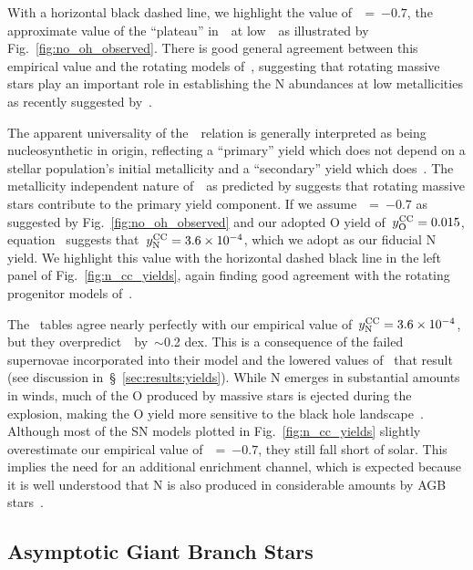 \documentclass[ms.tex]{subfiles}
\begin{document}
With a horizontal black dashed line, we highlight the value
of~\no\subcc~=~$-0.7$, the approximate value of the ``plateau'' in~\no~at
low~\oh~as illustrated by Fig.~\ref{fig:no_oh_observed}.
There is good general agreement between this empirical value and the rotating
models of~\citet{Limongi2018}, suggesting that rotating massive stars play an
important role in establishing the N abundances at low metallicities as
recently suggested by~\citet{Grisoni2021}.
\par
The apparent universality of the~\ohno~relation is generally interpreted as
being nucleosynthetic in origin, reflecting a ``primary'' yield which does not
depend on a stellar population's initial metallicity and a ``secondary'' yield
which does~\citep[e.g.][]{PerezMontero2009, Berg2012, Pilyugin2012,
Andrews2013}.
The metallicity independent nature of~~as predicted by
\citet{Limongi2018} suggests that rotating massive stars contribute to the
primary yield component.
If we assume~\no\subcc~=~$-0.7$ as suggested by Fig.~\ref{fig:no_oh_observed}
and our adopted O yield of~$y_\text{O}^\text{CC} = 0.015$, equation~
suggests that~$y_\text{N}^\text{CC} = 3.6\times10^{-4}$, which we adopt as our fiducial
N yield.
We highlight this value with the horizontal dashed black line in the left panel
of Fig.~\ref{fig:n_cc_yields}, again finding good agreement with the rotating
progenitor models of~\citet{Limongi2018}.
\par
The~\citet{Sukhbold2016} tables agree nearly perfectly with our empirical value
of~$y_\text{N}^\text{CC} = 3.6\times10^{-4}$, but they overpredict~\no\subcc~by~$\sim$0.2
dex.
This is a consequence of the failed supernovae incorporated into their model
and the lowered values of~ that result (see discussion
in~\S~\ref{sec:results:yields}).
While N emerges in substantial amounts in winds, much of the O produced by
massive stars is ejected during the explosion, making the O yield more
sensitive to the black hole landscape~\citep{Griffith2021a}.
Although most of the SN models plotted in Fig.~\ref{fig:n_cc_yields} slightly
overestimate our empirical value of~\no\subcc~=~$-0.7$, they still fall short
of solar.
This implies the need for an additional enrichment channel, which is expected
because it is well understood that N is also produced in considerable amounts
by AGB stars~\citep{Johnson2019}.


\subsection{Asymptotic Giant Branch Stars}
\label{sec:yields:agb}
\end{document}
